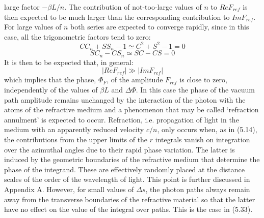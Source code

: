 \documentclass [12pt]{article}
\begin{document}
{     large factor $-\beta L/n$. The contribution of not-too-large values of $n$ to $ Re F_{ref}$
      is then expected to be much larger than the corresponding contribution to $Im F_{ref}$.
     For large values of $n$ both series are expected to converge rapidly, since in this case,
     all the trigonometric factors tend to zero:
    \[ C C_n+S S_n-1 \simeq C^2+S^2-1 = 0 \]
   \[ S C_n- C S_n \simeq SC-CS = 0 \]  
     It is then to be expected that, in general:
     \[ | Re F_{ref}| \gg | Im F_{ref}| \]
         which implies that the phase, $\Phi_F$, of the amplitude $ F_{ref}$
       is close to zero, independently of the values of  $\beta L$ and  $\Delta \Phi$. 
     In this case the phase of the vacuum path amplitude remains unchanged by the 
     interaction of the photon with the atoms of the refractive medium and
     a phenomenon that may be called `refraction annulment' is expected to occur.    
      Refraction, i.e. propagation of light in the medium with an apparently reduced
     velocity $c/n$, only occurs when, as in (5.14), the contributions from
     the upper limits of the $r$ integrals vanish on integration
    over the azimuthal angles due to their rapid phase variation.
     The latter is induced by the geometric boundaries of the refractive
     medium that determine the phase of the integrand.
    These are effectively randomly placed at the distance scales of the order 
     of the wavelength of light. This point
     is further discussed in Appendix A. However, for small values of $\Delta s$, the photon paths
     always remain away from the transverse boundaries of the refractive material so that the latter
     have no effect on the value of the integral over paths. This is the case in (5.33).
 
}
\end{document}
